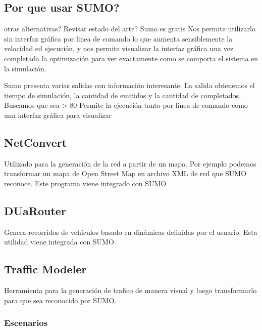 \subsection{Por que usar SUMO? }
otras alternativas? Revisar estado del arte?
Sumo es gratis
Nos permite utilizarlo sin interfaz gráfica por linea de comando lo que aumenta sensiblemente la velocidad ed ejecución, y  nos permite visualizar la interfaz gráfica una vez completada la optimización para ver exactamente como se comporta el sistema en la simulación.

Sumo presenta varias salidas con información interesante: \citep{SUMOOUT} 
La salida obtenemos el tiempo de simulación, la cantidad de emitidos y la cantidad de completados. Buscamos que sea > 80%
Permite la ejecución tanto por linea de comando como una interfaz gráfica para visualizar

\subsection{NetConvert}
Utilizado para la generación de la red a partir de un mapa. Por ejemplo podemos transformar un mapa de Open Street Map en archivo XML de red que SUMO reconoce. Este programa viene integrado con SUMO

\subsection{DUaRouter}
 Genera recorridos de vehículos basado en dinámicas definidas por el usuario. Esta utilidad viene integrada con SUMO.

\subsection{Traffic Modeler}
Herramienta para la generación de trafico de manera visual y luego transformarlo para que sea reconocido por SUMO. \citep{TrafficModeler}

\subsubsection{Escenarios}



